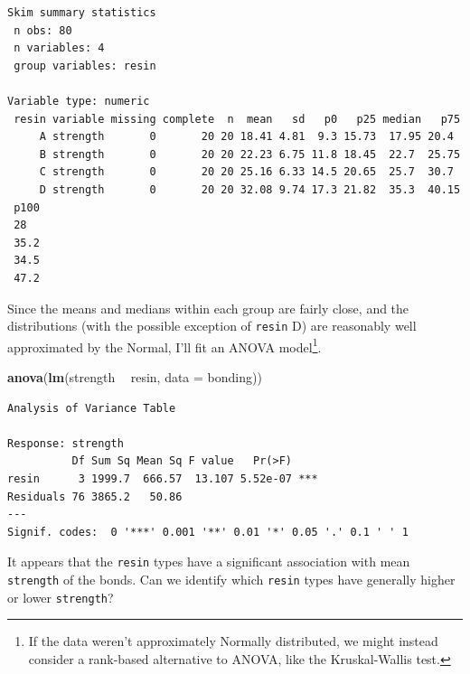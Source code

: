 \documentclass[]{book}
\newenvironment{Shaded}{\begin{snugshade}}{\end{snugshade}}
\newcommand{\KeywordTok}[1]{\textcolor[rgb]{0.13,0.29,0.53}{\textbf{#1}}}
\newcommand{\DataTypeTok}[1]{\textcolor[rgb]{0.13,0.29,0.53}{#1}}
\newcommand{\StringTok}[1]{\textcolor[rgb]{0.31,0.60,0.02}{#1}}
\newcommand{\OperatorTok}[1]{\textcolor[rgb]{0.81,0.36,0.00}{\textbf{#1}}}
\newcommand{\NormalTok}[1]{#1}
\let\rmarkdownfootnote\footnote%
\def\footnote{\protect\rmarkdownfootnote}
\theoremstyle{definition}
\theoremstyle{definition}
\theoremstyle{definition}
\theoremstyle{remark}
\begin{document}
\begin{Shaded}
\end{Shaded}

\begin{verbatim}
Skim summary statistics
 n obs: 80 
 n variables: 4 
 group variables: resin 

Variable type: numeric 
 resin variable missing complete  n  mean   sd   p0   p25 median   p75
     A strength       0       20 20 18.41 4.81  9.3 15.73  17.95 20.4 
     B strength       0       20 20 22.23 6.75 11.8 18.45  22.7  25.75
     C strength       0       20 20 25.16 6.33 14.5 20.65  25.7  30.7 
     D strength       0       20 20 32.08 9.74 17.3 21.82  35.3  40.15
 p100
 28  
 35.2
 34.5
 47.2
\end{verbatim}

Since the means and medians within each group are fairly close, and the
distributions (with the possible exception of \texttt{resin} D) are
reasonably well approximated by the Normal, I'll fit an ANOVA
model\footnote{If the data weren't approximately Normally distributed,
  we might instead consider a rank-based alternative to ANOVA, like the
  Kruskal-Wallis test.}.

\begin{Shaded}
\begin{Highlighting}[]
\KeywordTok{anova}\NormalTok{(}\KeywordTok{lm}\NormalTok{(strength }\OperatorTok{~}\StringTok{ }\NormalTok{resin, }\DataTypeTok{data =}\NormalTok{ bonding))}
\end{Highlighting}
\end{Shaded}

\begin{verbatim}
Analysis of Variance Table

Response: strength
          Df Sum Sq Mean Sq F value   Pr(>F)    
resin      3 1999.7  666.57  13.107 5.52e-07 ***
Residuals 76 3865.2   50.86                     
---
Signif. codes:  0 '***' 0.001 '**' 0.01 '*' 0.05 '.' 0.1 ' ' 1
\end{verbatim}

It appears that the \texttt{resin} types have a significant association
with mean \texttt{strength} of the bonds. Can we identify which
\texttt{resin} types have generally higher or lower \texttt{strength}?
\end{document}
